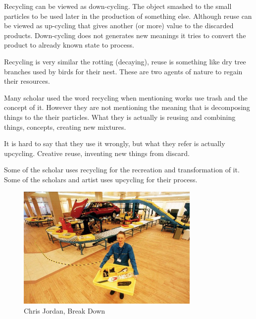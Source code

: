 Recycling can be viewed as down-cycling. The object smashed to the small particles to be used later in the production of something else. Although reuse can be viewed as up-cycling that gives another (or more) value to the discarded products. Down-cycling does not generates new meanings it tries to convert the product to already known state to process. 

Recycling is very similar the rotting (decaying), reuse is something like dry tree branches used by birds for their nest. These are two agents of nature to regain their resources.

Many scholar used the word recycling when mentioning works use trash and the concept of it. However they are not mentioning the meaning that is decomposing things to the their particles. What they is actually is reusing and combining things, concepts, creating new mixtures.

It is hard to say that they use it wrongly, but what they refer is actually upcycling. Creative reuse, inventing new things from discard.

Some of the scholar uses recycling \cite{cerny1996recycled,herman1998trashformations} for the recreation and transformation of it. Some of the scholars and artist uses upcycling for their process. 


\begin{figure}[h!]
  \centering
  \includegraphics[height=6cm]{graphics/ChrisJordan_BreakDown.jpg}
  \caption{Chris Jordan, Break Down}
  \label{fig:ChrisJordan_BreakDown}
\end{figure}

